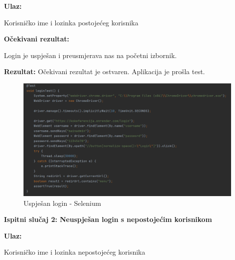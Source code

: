   \newLine
   
   \textbf{Ulaz:}
   \begin{packed_item}
   \item[] \begin{packed_enum}
				
				\item Korisničko ime i lozinka postojećeg korisnika
				
			\end{packed_enum}
   \end{packed_item}

   \textbf{Očekivani rezultat:}
   \begin{packed_item}
   \item[] \begin{packed_enum}
				
				\item Login je uspješan i preusmjerava nas na početni izbornik. 
				
			\end{packed_enum}
   \end{packed_item}
   \textbf{Rezultat:} \text Očekivani rezultat je ostvaren. \color{red} Aplikacija je prošla test. \color{black}

    \begin{figure}[H]
            \includegraphics[width = \textwidth]{slike/Login succesful.png}
			
			\centering
			\caption{Uspješan login - Selenium}
			\label{fig:uspjesan login selenium}
			\end{figure}

   \textbf{Ispitni slučaj 2: Neuspješan login s nepostojećim korisnikom\newline}

  \newLine
   
   \textbf{Ulaz:}
   \begin{packed_item}
   \item[] \begin{packed_enum}
				
				\item Korisničko ime i lozinka nepostojećeg korisnika
				
			\end{packed_enum}
   \end{packed_item}

